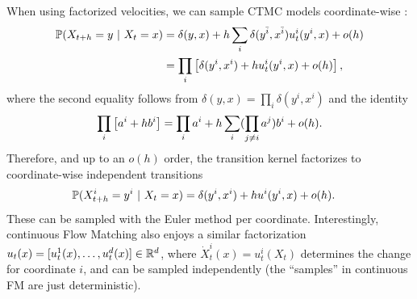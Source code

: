 \documentclass{fairmeta}
\renewcommand{\eqref}[1]{\labelcref{#1}}
\numberwithin{equation}{section}
\begin{document}
When using factorized velocities, we can sample CTMC models coordinate-wise \citep{campbell2024generative}:
\begin{align*}
    {\mathbb{P}}(X_{t+h}=y \ \vert \ X_t=x) &= \delta(y,x) + h\sum_{i}\delta(y^{\bar{i}},x^{\bar{i}})u_t^i(y^i,x) + o(h) \\
    &= \prod_i\left [\delta(y^i,x^i) + hu_t^i(y^i,x) + o(h)\right ],
\end{align*}
where the second equality follows from $\delta(y,x)=\prod_i \delta(y^i,x^i)$ and the identity
\begin{equation*}
 \prod_{i}\left [a^i+h b^i\right ] = \prod_{i}a^i + h\sum_i (\prod_{j\ne i}a^{j}) b^i + o(h).   
\end{equation*}
Therefore, and up to an $o(h)$ order, the transition kernel factorizes to coordinate-wise independent transitions
\begin{align}\label{e:sampling_factorized_per_coord}
    {\mathbb{P}}(X_{t+h}^i = y^i \ \vert \ X_t=x) &= \delta(y^i,x^i) + hu^i(y^i,x) + o(h).
\end{align}
These can be sampled with the Euler method \eqref{e:ctmc_euler} per coordinate.
Interestingly, continuous Flow Matching also enjoys a similar factorization $u_t(x) = [u_t^1(x),\ldots, u_t^d(x)]\in \mathbb R^d$, where $\dot{X}^i_t(x)=u^i_t(X_t)$ determines the change for coordinate $i$, and can be sampled independently (the ``samples'' in continuous FM are just deterministic). 
\end{document}
